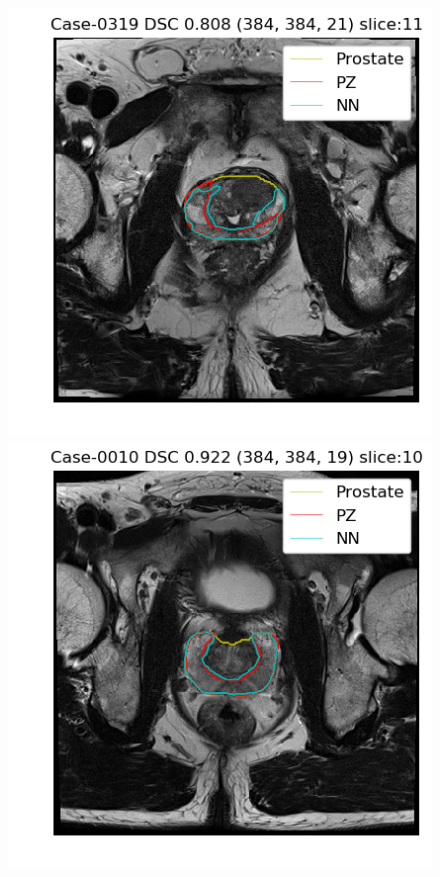 \begin{figure}[h]
    \includegraphics[totalheight=.2\textheight]{imgs/results/PZ_Px_Challenge__P_yes_Original_MEAN_Case-0319.png}
    \includegraphics[totalheight=.2\textheight]{imgs/results/PZ_Px_Challenge__P_yes_Original_MAX_Case-0010.png}
    \vspace{10mm}

\end{figure}
